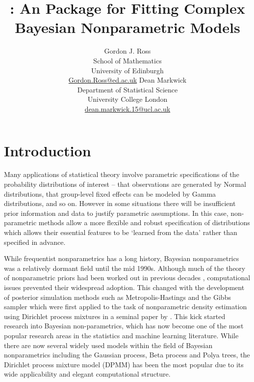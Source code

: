 \documentclass[nojss]{jss}
\author{Gordon J. Ross\\School of Mathematics\\University of Edinburgh\\\href{Gordon.Ross@ed.ac.uk}{Gordon.Ross@ed.ac.uk} \And
Dean Markwick\\Department of Statistical Science\\University College London\\\href{dean.markwick.15@ucl.ac.uk}{dean.markwick.15@ucl.ac.uk}}
\title{\pkg{dirichletprocess}: An \proglang{R} Package for Fitting Complex Bayesian Nonparametric Models}
\begin{document}


\section[Introduction]{Introduction} \label{sec:intro}

Many applications of statistical theory involve parametric specifications of the probability distributions of interest -- that observations are generated by Normal distributions, that group-level fixed effects can be modeled by Gamma distributions, and so on. However in some situations there will be insufficient prior information and data to justify parametric assumptions. In this case, non-parametric methods allow a more flexible and robust specification of distributions which allows their essential features to be `learned from the data' rather than specified in advance.

While frequentist nonparametrics has a long history, Bayesian nonparametrics was a relatively dormant field until the mid 1990s. Although much of the theory of nonparametric priors had been worked out in previous decades \citep{ferguson_bayesian_1973}, computational issues prevented their widespread adoption. This changed with the development of posterior simulation methods such as Metropolis-Hastings \citep{hastings_monte_1970} and the Gibbs sampler \citep{geman_stochastic_1984} which were first applied to the task of nonparametric density estimation using Dirichlet process mixtures in a seminal paper by \cite{escobar_bayesian_1995}. This kick started research into Bayesian non-parametrics, which has now become one of the most popular research areas in the statistics and machine learning literature. While there are now several widely used models within the field of Bayesian nonparametrics including the Gaussian process, Beta process and Polya trees, the Dirichlet process mixture model (DPMM) has been the most popular due to its wide applicability and elegant computational structure.
\end{document}

